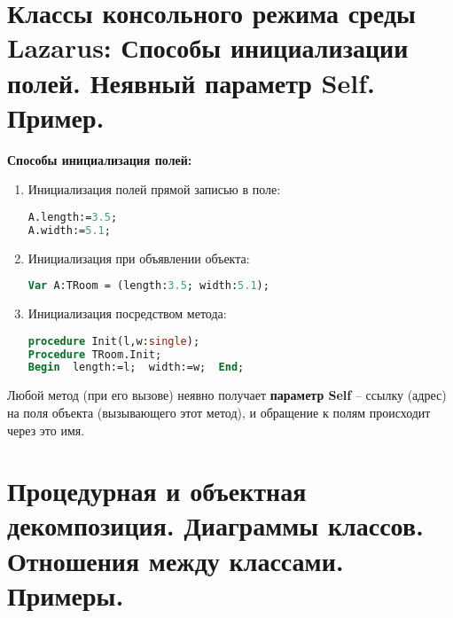 
\newpage\section{Классы консольного режима  среды  Lazarus: Способы инициализации полей. Неявный параметр Self. Пример. }

\begin{myquote}
            
\end{myquote}

{\bf {Способы инициализация полей:}}
\begin{enumerate}
\item Инициализация полей прямой записью в поле:

\begin{lstlisting}[language=Pascal]
A.length:=3.5;
A.width:=5.1;
\end{lstlisting}

\item Инициализация при объявлении объекта: 
\begin{lstlisting}[language=Pascal]
Var A:TRoom = (length:3.5; width:5.1);
\end{lstlisting}

\item Инициализация посредством метода:
\begin{lstlisting}[language=Pascal]
procedure Init(l,w:single);
Procedure TRoom.Init;
Begin  length:=l;  width:=w;  End;
\end{lstlisting}

\end{enumerate}

Любой метод (при его вызове) неявно получает {\bf{параметр Self}} – ссылку (адрес) на 
поля объекта (вызывающего этот метод), и обращение к полям происходит через это имя.



\newpage\section{Процедурная и объектная декомпозиция. Диаграммы классов. Отношения между классами. Примеры. }

\begin{myquote}
            
\end{myquote}

